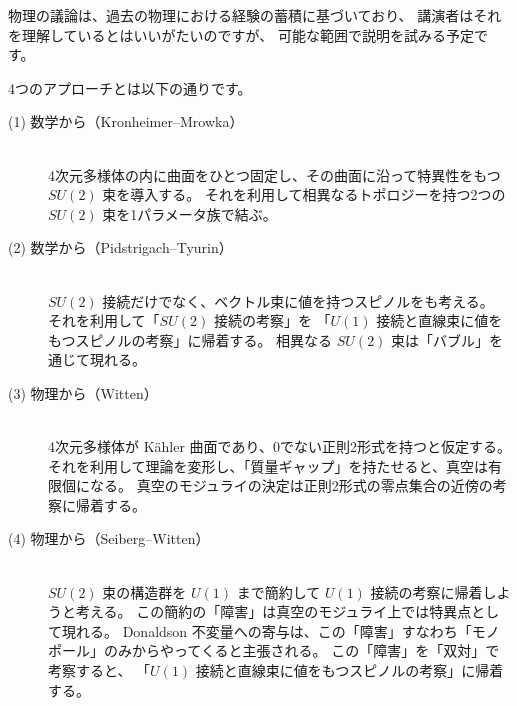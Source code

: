 \documentclass[uplatex,dvipdfmx]{jlreq}
\begin{document}
物理の議論は、過去の物理における経験の蓄積に基づいており、
講演者はそれを理解しているとはいいがたいのですが、
可能な範囲で説明を試みる予定です。

4つのアプローチとは以下の通りです。

\begin{description}
  \item[(1) 数学から（Kronheimer--Mrowka）]\mbox{}\\
        4次元多様体の内に曲面をひとつ固定し、その曲面に沿って特異性をもつ $SU(2)$ 束を導入する。
        それを利用して相異なるトポロジーを持つ2つの $SU(2)$ 束を1パラメータ族で結ぶ。

  \item[(2) 数学から（Pidstrigach--Tyurin）]\mbox{}\\
        $SU(2)$ 接続だけでなく、ベクトル束に値を持つスピノルをも考える。
        それを利用して「$SU(2)$ 接続の考察」を
        「$U(1)$ 接続と直線束に値をもつスピノルの考察」に帰着する。
        相異なる $SU(2)$ 束は「バブル」を通じて現れる。

  \item[(3) 物理から（Witten）]\mbox{}\\
        4次元多様体が Kähler 曲面であり、0でない正則2形式を持つと仮定する。
        それを利用して理論を変形し、「質量ギャップ」を持たせると、真空は有限個になる。
        真空のモジュライの決定は正則2形式の零点集合の近傍の考察に帰着する。

  \item[(4) 物理から（Seiberg--Witten）]\mbox{}\\
        $SU(2)$ 束の構造群を $U(1)$ まで簡約して $U(1)$ 接続の考察に帰着しようと考える。
        この簡約の「障害」は真空のモジュライ上では特異点として現れる。
        Donaldson 不変量への寄与は、この「障害」すなわち「モノポール」のみからやってくると主張される。
        この「障害」を「双対」で考察すると、
        「$U(1)$ 接続と直線束に値をもつスピノルの考察」に帰着する。
\end{description}
\end{document}
